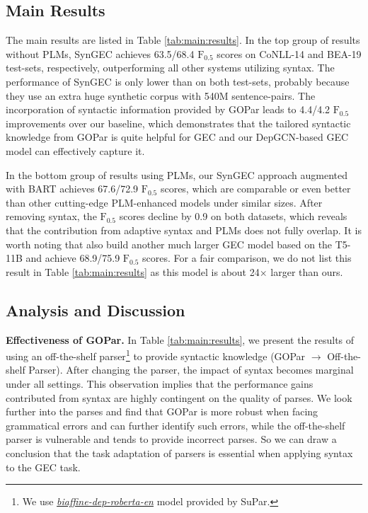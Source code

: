 \documentclass[11pt]{article}
\begin{document}
\label{sec:res}
\subsection{Main Results}
The main results are listed in Table \ref{tab:main:results}. 
In the top group of results without PLMs, SynGEC achieves 63.5/68.4 $\mbox{F}_{0.5}$ scores on CoNLL-14 and BEA-19 test-sets, respectively, outperforming all other systems utilizing syntax.
The performance of SynGEC is only lower than \citet{stahlberg2021synthetic} on both test-sets, probably because they use an extra huge synthetic corpus with 540M sentence-pairs. The incorporation of syntactic information provided by GOPar leads to 4.4/4.2 $\mbox{F}_{0.5}$ improvements 
over our baseline, which demonstrates that the tailored syntactic knowledge from GOPar is quite helpful for GEC and our DepGCN-based GEC model can effectively capture it. 

In the bottom group of results using PLMs, our SynGEC approach augmented with BART achieves 67.6/72.9 $\mbox{F}_{0.5}$ scores, which are comparable or even better than other cutting-edge PLM-enhanced models under similar sizes.
After removing syntax, the $\mbox{F}_{0.5}$ scores decline by 0.9 on both datasets, which reveals that the contribution from adaptive syntax and PLMs does not fully overlap. It is worth noting that \citet{rothe2021recipe} also build another much larger GEC model based on the T5-11B \citep{raffel2020exploring} and achieve 68.9/75.9  $\mbox{F}_{0.5}$ scores. For a fair comparison, we do not list this result in Table \ref{tab:main:results} as this model is about 24$\times$ larger than ours. 









\subsection{Analysis and Discussion}
\label{ref:sec:analysis}




\label{sec:ana}
\textbf{Effectiveness of GOPar.} In Table \ref{tab:main:results}, we present the results of using an off-the-shelf parser\footnote{We use \href{https://github.com/yzhangcs/parser/releases/download/v1.1.0/ptb.biaffine.dep.roberta.zip}{\textit{biaffine-dep-roberta-en}} model provided by SuPar.} 
to provide syntactic knowledge (GOPar $\rightarrow$ Off-the-shelf Parser). After changing the parser, the impact of syntax becomes marginal under all settings. This observation implies that the performance gains contributed from syntax are highly contingent on the quality of parses. We look further into the parses and find that GOPar is more robust when facing grammatical errors and can further identify such errors, while the off-the-shelf parser is vulnerable and tends to provide incorrect parses. So we can draw a conclusion that the task adaptation of parsers is essential when applying syntax to the GEC task.
\end{document}

